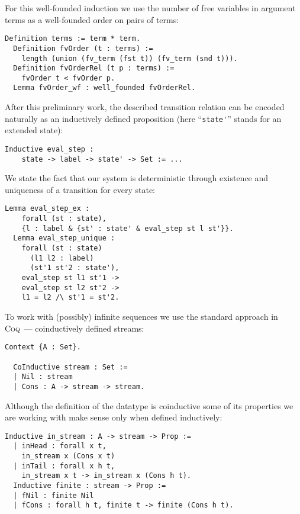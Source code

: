 For this well-founded induction we use the number of free variables in argument terms as a well-founded order on pairs of terms:

\begin{lstlisting}[language=Coq,basicstyle=\footnotesize]
  Definition terms := term * term.
  Definition fvOrder (t : terms) :=
    length (union (fv_term (fst t)) (fv_term (snd t))).
  Definition fvOrderRel (t p : terms) :=
    fvOrder t < fvOrder p.
  Lemma fvOrder_wf : well_founded fvOrderRel.
\end{lstlisting}

After this preliminary work, the described transition relation can be encoded naturally as an inductively defined proposition (here ``\lstinline|state'|''
stands for an extended state):

\begin{lstlisting}[language=Coq,basicstyle=\footnotesize]
  Inductive eval_step :
    state -> label -> state' -> Set := ...
\end{lstlisting}

We state the fact that our system is deterministic through existence and uniqueness of a transition for every state:

\begin{lstlisting}[language=Coq,basicstyle=\footnotesize]
  Lemma eval_step_ex :
    forall (st : state),
    {l : label & {st' : state' & eval_step st l st'}}.
  Lemma eval_step_unique :
    forall (st : state)
      (l1 l2 : label)
      (st'1 st'2 : state'),
    eval_step st l1 st'1 ->
    eval_step st l2 st'2 ->
    l1 = l2 /\ st'1 = st'2.
\end{lstlisting}

To work with (possibly) infinite sequences we use the standard approach in \textsc{Coq}~--- coinductively defined streams:

\begin{lstlisting}[language=Coq,basicstyle=\footnotesize]
  Context {A : Set}.

  CoInductive stream : Set :=
  | Nil : stream
  | Cons : A -> stream -> stream.
\end{lstlisting}

Although the definition of the datatype is coinductive some of its properties we are working with make sense only when defined inductively:

\begin{lstlisting}[language=Coq,basicstyle=\footnotesize]
  Inductive in_stream : A -> stream -> Prop :=
  | inHead : forall x t,
    in_stream x (Cons x t)
  | inTail : forall x h t,
    in_stream x t -> in_stream x (Cons h t).
  Inductive finite : stream -> Prop :=
  | fNil : finite Nil
  | fCons : forall h t, finite t -> finite (Cons h t).
\end{lstlisting}


